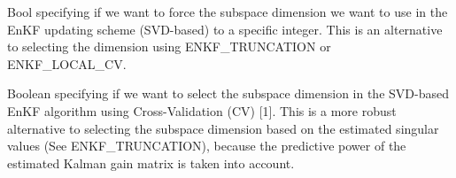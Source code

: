 \documentclass[letterpaper,10pt,english]{sphinxmanual}
\begin{document}
\begin{sphinxShadowBox}

Bool specifying if we want to force the subspace dimension we want to use in
the EnKF updating scheme (SVD-based) to a specific integer. This is an
alternative to selecting the dimension using ENKF\_TRUNCATION or ENKF\_LOCAL\_CV.


%
\begin{sphinxVerbatim}[commandchars=\\\{\}]
       
     
              
\end{sphinxVerbatim}
\end{sphinxShadowBox}
\label{\detokenize{keywords/index:enkf-local-cv}}
\begin{sphinxShadowBox}

Boolean specifying if we want to select the subspace dimension in the
SVD-based EnKF algorithm using Cross-Validation (CV) {[}1{]}. This is a more
robust alternative to selecting the subspace dimension based on the estimated
singular values (See ENKF\_TRUNCATION), because the predictive power of the
estimated Kalman gain matrix is taken into account.


%
\begin{sphinxVerbatim}[commandchars=\\\{\}]
      
 
\end{sphinxVerbatim}
\end{sphinxShadowBox}
\label{\detokenize{keywords/index:enkf-pen-press}}
\end{document}
